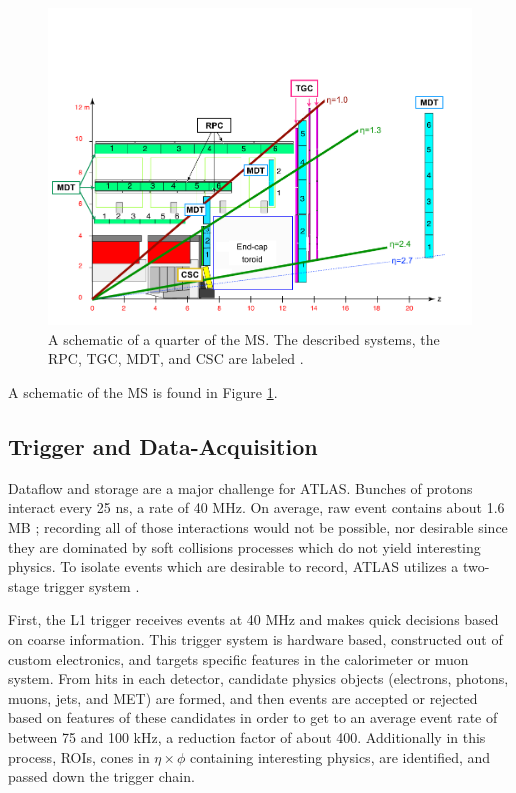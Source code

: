 \begin{figure}[!ht]
    \centering
    \includegraphics[width=.9\textwidth]{chapters/chapter2_experiment/images/muon_detector.png}
    \caption[A schematic of a quarter of the \gls{MS}]{A schematic of a quarter of the \gls{MS}. The described systems, the \gls{RPC}, \gls{TGC}, \gls{MDT}, and \gls{CSC} are labeled \cite{muon-performance2015}.}
    \label{fig:muon-schematic}
\end{figure}

A schematic of the \gls{MS} is found in Figure \ref{fig:muon-schematic}.

\subsection{Trigger and Data-Acquisition} \label{ssec:tdaq}

Dataflow and storage are a major challenge for ATLAS. Bunches of protons interact every 25 ns, a rate of 40 MHz. On average, raw event contains about 1.6 MB \cite{ATLASfact-sheet}; recording all of those interactions would not be possible, nor desirable since they are dominated by soft collisions processes which do not yield interesting physics. To isolate events which are desirable to record, ATLAS utilizes a two-stage trigger system \cite{triggerTDR}.

First, the \gls{L1} trigger receives events at 40 MHz and makes quick decisions based on coarse information. This trigger system is hardware based, constructed out of custom electronics, and targets specific features in the calorimeter or muon system. From hits in each detector, candidate physics objects (electrons, photons, muons, jets, and \gls{MET}) are formed, and then events are accepted or rejected based on features of these candidates in order to get to an average event rate of between 75 and 100 kHz, a reduction factor of about 400. Additionally in this process, \glspl{ROI}, cones in $\eta \times \phi$ containing interesting physics, are identified, and passed down the trigger chain.

